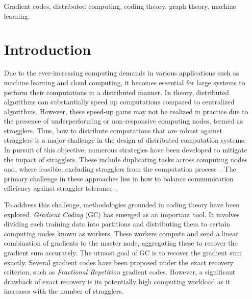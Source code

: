 \documentclass[lettersize,journal]{IEEEtran}
\begin{document}
\begin{IEEEkeywords}
Gradient codes, distributed computing, coding theory, graph theory, machine learning.
\end{IEEEkeywords}


\section{Introduction}
Due to the ever-increasing computing demands in various applications such as machine learning and cloud computing, it becomes essential for large systems to perform their computations in a distributed manner. In theory, distributed algorithms can substantially speed up computations compared to centralized algorithms. However, these speed-up gains may not be realized in practice due to the presence of underperforming or non-responsive computing nodes, termed as stragglers\cite{stragglers}. Thus, how to distribute computations that are robust against stragglers is a major challenge in the design of distributed computation systems. In pursuit of this objective, numerous strategies have been developed to mitigate the impact of stragglers. These include duplicating tasks across computing nodes~\cite{aktas2017effective} and, where feasible, excluding stragglers from the computation process~\cite{ananthanarayanan2013effective}. The primary challenge in these approaches lies in how to balance communication efficiency against straggler tolerance~\cite{zaharia2010spark}.

To address this challenge, methodologies grounded in coding theory have been explored. \textit{Gradient Coding} (GC) has emerged as an important tool. It involves dividing each training data into partitions and distributing them to certain computing nodes known as workers. These workers compute and send a linear combination of gradients to the master node, aggregating these to recover the gradient sum accurately. The utmost goal of GC is to recover the gradient sum exactly. Several gradient codes have been proposed under the exact recovery criterion, such as \textit{Fractional Repetition} gradient codes. However, a significant drawback of exact recovery is its potentially high computing workload as it increases with the number of stragglers.
\end{document}
